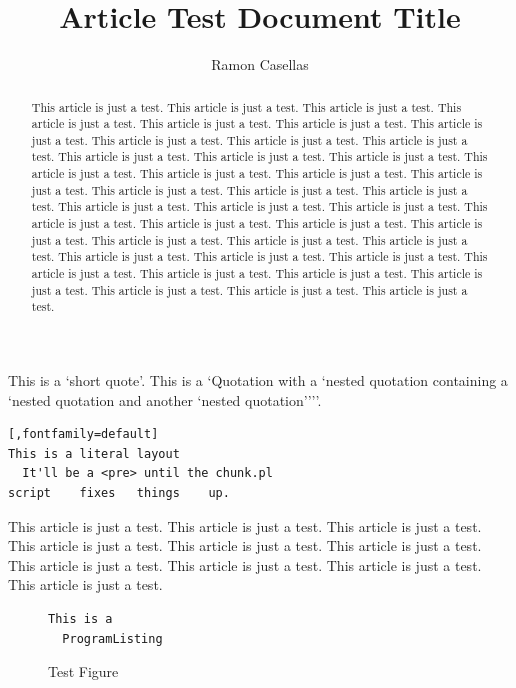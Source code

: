 \documentclass[pdftex,english,a4paper,10pt,twocolumn]{infocom}
\title{Article Test Document Title}
\author{Ramon Casellas}
\begin{document}
\maketitle

\begin{abstract}

This article is just a test. This article is just a test. 
This article is just a test. This article is just a test. 
This article is just a test. This article is just a test. 
This article is just a test. This article is just a test. 
This article is just a test. This article is just a test. 
This article is just a test. This article is just a test. 
This article is just a test. This article is just a test. 
This article is just a test. This article is just a test. 
This article is just a test. This article is just a test. 
This article is just a test. This article is just a test. 
This article is just a test. This article is just a test. 
This article is just a test. This article is just a test. 
This article is just a test. This article is just a test. 
This article is just a test. This article is just a test. 
This article is just a test. This article is just a test. 
This article is just a test. This article is just a test. 
This article is just a test. This article is just a test. 
This article is just a test. This article is just a test. 
This article is just a test. This article is just a test. 
This article is just a test. This article is just a test. 

\end{abstract}



This is a `short quote'.
This is a `Quotation with a `nested quotation
containing a `nested quotation and another `nested
quotation''''.


\begin{Verbatim}[,fontfamily=default]
This is a literal layout
  It'll be a <pre> until the chunk.pl
script    fixes   things    up.
\end{Verbatim}

This article is just a test. This article is just a test.
This article is just a test. This article is just a test. 
This article is just a test. This article is just a test. 
This article is just a test. This article is just a test. 
This article is just a test. This article is just a test. 


\begin{figure}[hbt]
\begin{center}%
\hypertarget{testfig}{}%

\begin{Verbatim}[]
This is a
  ProgramListing

\end{Verbatim}
\caption{{{Test Figure}}}
\label{testfig}
\end{center}
\end{figure}
\end{document}
